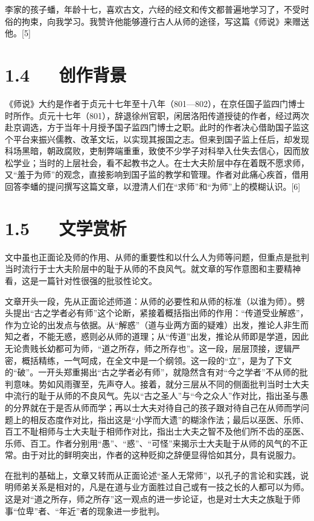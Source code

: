 \documentclass[letterpaper,12pt,english]{sphinxmanual}
\begin{document}
李家的孩子蟠，年龄十七，喜欢古文，六经的经文和传文都普遍地学习了，不受时俗的拘束，向我学习。我赞许他能够遵行古人从师的途径，写这篇《师说》来赠送他。{[}5{]}


\section{1.4   创作背景}
\label{\detokenize{p01_u6563_u6587/_u97e9_u6108-_u5e08_u8bf4:id6}}
《师说》大约是作者于贞元十七年至十八年（801—802），在京任国子监四门博士时所作。贞元十七年（801），辞退徐州官职，闲居洛阳传道授徒的作者，经过两次赴京调选，方于当年十月授予国子监四门博士之职。此时的作者决心借助国子监这个平台来振兴儒教、改革文坛，以实现其报国之志。但来到国子监上任后，却发现科场黑暗，朝政腐败，吏制弊端重重，致使不少学子对科举入仕失去信心，因而放松学业；当时的上层社会，看不起教书之人。在士大夫阶层中存在着既不愿求师，又“羞于为师”的观念，直接影响到国子监的教学和管理。作者对此痛心疾首，借用回答李蟠的提问撰写这篇文章，以澄清人们在“求师”和“为师”上的模糊认识。{[}6{]}


\section{1.5   文学赏析}
\label{\detokenize{p01_u6563_u6587/_u97e9_u6108-_u5e08_u8bf4:id7}}
文中虽也正面论及师的作用、从师的重要性和以什么人为师等问题，但重点是批判当时流行于士大夫阶层中的耻于从师的不良风气。就文章的写作意图和主要精神看，这是一篇针对性很强的批驳性论文。

文章开头一段，先从正面论述师道：从师的必要性和从师的标准（以谁为师）。劈头提出“古之学者必有师”这个论断，紧接着概括指出师的作用：“传道受业解惑”，作为立论的出发点与依据。从“解惑”（道与业两方面的疑难）出发，推论人非生而知之者，不能无惑，惑则必从师的道理；从“传道”出发，推论从师即是学道，因此无论贵贱长幼都可为师，“道之所存，师之所存也”。这一段，层层顶接，逻辑严密，概括精练，一气呵成，在全文中是一个纲领。这一段的“立”，是为了下文的“破”。一开头郑重揭出“古之学者必有师”，就隐然含有对“今之学者”不从师的批判意味。势如风雨骤至，先声夺人。接着，就分三层从不同的侧面批判当时士大夫中流行的耻于从师的不良风气。先以“古之圣人”与“今之众人”作对比，指出圣与愚的分界就在于是否从师而学；再以士大夫对待自己的孩子跟对待自己在从师而学问题上的相反态度作对比，指出这是“小学而大遗”的糊涂作法；最后以巫医、乐师、百工不耻相师与士大夫耻于相师作对比，指出士大夫之智不及他们所不齿的巫医、乐师、百工。作者分别用“愚”、“惑”、“可怪”来揭示士大夫耻于从师的风气的不正常。由于对比的鲜明突出，作者的这种贬抑之辞便显得恰如其分，具有说服力。

在批判的基础上，文章又转而从正面论述“圣人无常师”，以孔子的言论和实践，说明师弟关系是相对的，凡是在道与业方面胜过自己或有一技之长的人都可以为师。这是对“道之所存，师之所存”这一观点的进一步论证，也是对士大夫之族耻于师事“位卑”者、“年近”者的现象进一步批判。
\end{document}
